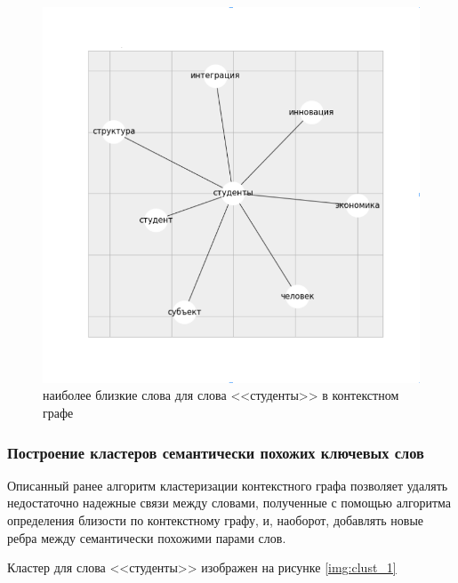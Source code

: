 \begin{figure}[ht]
  \begin{minipage}[ht]{1.0\linewidth}\centering
    \includegraphics[width=1.0\linewidth]{Dissertation/pics/students_sim}
    \caption{наиболее близкие слова для слова <<студенты>> в контекстном графе}
  \end{minipage}
  \label{img:sim_2}
\end{figure}


\subsubsection{Построение кластеров семантически похожих ключевых слов}

Описанный ранее алгоритм кластеризации контекстного графа позволяет удалять недостаточно надежные связи между словами, полученные с помощью алгоритма определения близости по контекстному графу, и, наоборот, добавлять новые ребра между семантически похожими парами слов. 

Кластер для слова <<студенты>> изображен на рисунке \ref{img:clust_1}

